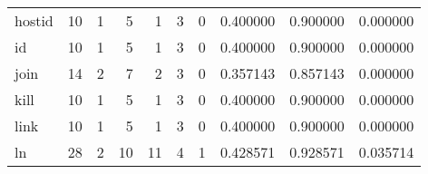 \begin{tabular}{lrrrrrrrrr}
hostid    &                                       10 &                                                  1 &                                                  5 &                                                  1 &                                                  3 &                                                  0 &                                           0.400000 &                               0.900000 &                             0.000000 \\
id        &                                       10 &                                                  1 &                                                  5 &                                                  1 &                                                  3 &                                                  0 &                                           0.400000 &                               0.900000 &                             0.000000 \\
join      &                                       14 &                                                  2 &                                                  7 &                                                  2 &                                                  3 &                                                  0 &                                           0.357143 &                               0.857143 &                             0.000000 \\
kill      &                                       10 &                                                  1 &                                                  5 &                                                  1 &                                                  3 &                                                  0 &                                           0.400000 &                               0.900000 &                             0.000000 \\
link      &                                       10 &                                                  1 &                                                  5 &                                                  1 &                                                  3 &                                                  0 &                                           0.400000 &                               0.900000 &                             0.000000 \\
ln        &                                       28 &                                                  2 &                                                 10 &                                                 11 &                                                  4 &                                                  1 &                                           0.428571 &                               0.928571 &                             0.035714 \\

\end{tabular}

